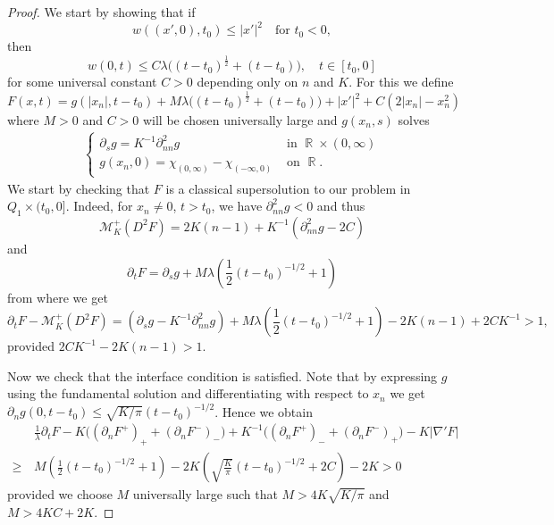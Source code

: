 \documentclass[10pt,a4paper]{amsart}
\newcommand*{\Mp}{\mathcal{M}_{K}^{+}}
\DeclareMathOperator{\R}{\mathbb{R}}
\newcommand{\p}{\partial}
\begin{document}
\begin{proof}
    We start by showing that if 
    \begin{equation}\label{eq:claim_initial_assump}
         w((x',0),t_0)\leq |x'|^2 \quad \text{for } t_0 <0,
    \end{equation}
    then
    \begin{equation} \label{eq:claim_tracetime}
         w(0,t)\leq C\lambda \big((t-t_0)^\frac{1}{2}+(t-t_0)\big), \quad t \in [t_0, 0]
    \end{equation}
    for some universal constant $C>0$ depending only on $n$ and $K$. For this we define
    \[
    F(x,t)=g(|x_n|,t-t_0)+M\lambda\big((t-t_0)^\frac{1}{2}+(t-t_0)\big)+|x'|^2+C(2|x_n|-x_n^2)
    \]
    where $M>0$ and $C>0$ will be chosen universally large and $g(x_n,s)$ solves 
    \begin{equation} \label{eq:construction_g}
    \begin{aligned}
        \begin{cases}
           \p_s  g=K^{-1}\p_{nn}^2 g &\mbox{ in } \R\times(0,\infty)\\
            g(x_n,0)=\chi_{(0,\infty)}-\chi_{(-\infty,0)}&\mbox{ on } \R.
        \end{cases}
    \end{aligned}
    \end{equation}
    We start by checking that $F$ is a classical supersolution to our problem in $Q_1 \times (t_0,0]$. Indeed, for $x_n\neq 0$, $t>t_0$, we have $\p_{nn}^2 g<0$ and thus
    \[
    \Mp(D^2F)=2K(n-1)+K^{-1}(\p_{nn}^2 g-2C)
    \]
    and
    \[
    \p_t F=\p_s g+M\lambda\left(\frac{1}{2}(t-t_0)^{-1/2}+1\right)
    \]
    from where we get
    \[
    \p_tF-\Mp(D^2F)=(\p_sg-K^{-1}\p^2_{nn}g)+M\lambda\left(\frac{1}{2}(t-t_0)^{-1/2}+1\right)-2K(n-1)+2C K^{-1}>1,
    \]
    provided $2CK^{-1} - 2K(n-1) > 1$.

    Now we check that the interface condition is satisfied. Note that by expressing $g$ using the fundamental solution and differentiating with respect to $x_n$ we get $\p_n g(0,t-t_0)\leq \sqrt{K/\pi} (t-t_0)^{-1/2}$. Hence we obtain
    \begin{align*}
        &\frac{1}{\lambda}\p_t F-K\big( (\p_n F^+)_+ + (\p_n F^-)_-\big)+K^{-1}\big( (\p_nF^+)_- + (\p_n F^-)_+\big)-K|\nabla' F|\\
        \geq\,&M\left(\frac{1}{2}(t-t_0)^{-1/2}+1\right)- 2K\left(\sqrt{\frac{K}{\pi}} (t-t_0)^{-1/2} + 2C\right) - 2K > 0
\end{align*}
provided we choose $M$ universally large such that $M > 4K\sqrt{K/\pi}$ and $M > 4KC + 2K$.
    


\end{proof}
\end{document}
